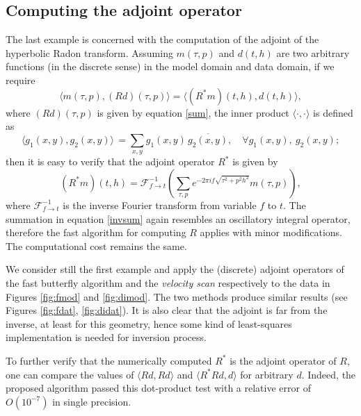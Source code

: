 

\subsection{Computing the adjoint operator}

The last example is concerned with the computation of the adjoint of the hyperbolic Radon transform. Assuming $m(\tau,p)$ and $d(t,h)$ are two arbitrary functions (in the discrete sense) in the model domain and data domain, if we require 
\begin{equation}
\langle m(\tau,p),(Rd)(\tau,p)\rangle =\langle(R^*m)(t,h),d(t,h)\rangle,
\end{equation}
where $(Rd)(\tau,p)$ is given by equation \ref{sum}, the inner product $\langle\cdot,\cdot\rangle$ is defined as
\begin{equation}
\langle g_1(x,y),g_2(x,y)\rangle\,=\sum_{x,y} g_1(x,y)\,\overline{g_2
(x,y)}, \quad \forall g_1(x,y), \ g_2(x,y);
\end{equation}
then it is easy to verify that the adjoint operator $R^*$ is given by
\begin{equation} \label{invsum}
(R^*m)(t,h)=\mathcal{F}_{f\rightarrow t}^{-1}\left(\sum_{\tau,p}e^{-2\pi i f \sqrt{\tau^2+p^2h^2}}m(\tau,p)\right),
\end{equation}
where $\mathcal{F}^{-1}_{f\rightarrow t}$ is the inverse Fourier transform from variable $f$ to $t$. The summation in equation \ref{invsum} again resembles an oscillatory integral operator, therefore the fast algorithm for computing $R$ applies with minor modifications. The computational cost remains the same.

We consider still the first example and apply the (discrete) adjoint operators of the fast butterfly algorithm and the {\it velocity scan} respectively to the data in Figures \ref{fig:fmod} and \ref{fig:dimod}. The two methods produce similar results (see Figures \ref{fig:fdat}, \ref{fig:didat}). It is also clear that the adjoint is far from the inverse, at least for this geometry, hence some kind of least-squares implementation is needed for inversion process.

To further verify that the numerically computed $R^*$ is the adjoint operator of $R$, one can compare the values of $\langle Rd,Rd\rangle$ and $\langle R^*Rd,d\rangle$ for arbitrary $d$. Indeed, the proposed algorithm passed this dot-product test with a relative error of $O(10^{-7})$ in single precision.

